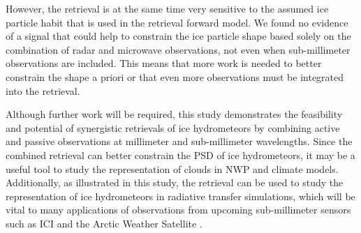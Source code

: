 \documentclass[journal abbreviation, manuscript]{copernicus}
\begin{document}
However, the retrieval is at the same time very sensitive to the assumed ice
particle habit that is used in the retrieval forward model. We found no evidence
of a signal that could help to constrain the ice particle shape based solely on
the combination of radar and microwave observations, not even when
sub-millimeter observations are included. This means that more work is needed to
better constrain the shape a priori or that even more observations must be
integrated into the retrieval.

Although further work will be required, this study demonstrates the feasibility
and potential of synergistic retrievals of ice hydrometeors by combining active
and passive observations at millimeter and sub-millimeter wavelengths. Since the
combined retrieval can better constrain the PSD of ice hydrometeors, it may be a
useful tool to study the representation of clouds in NWP and climate models.
Additionally, as illustrated in this study, the retrieval can be used to study
the representation of ice hydrometeors in radiative transfer simulations, which
will be vital to many applications of observations from upcoming sub-millimeter
sensors such as ICI and the Arctic Weather Satellite
\citep{arctic_weather_satellite}.






\appendix





\end{document}

